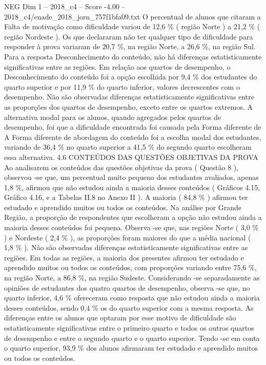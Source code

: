 \begin{textsample}{NEG Dim 1 – 2018\_c4 – Score -4.00 – 2018\_c4/enade\_2018\_jorn\_757f1bfa09.txt}
O percentual de alunos que citaram a Falta de motivação como dificuldade variou de 12,6 \% ( região Norte ) a 21,2 \% ( região Nordeste ).
Os que declararam não ter qualquer tipo de dificuldade para responder à prova variaram de 20,7 \%, na região Norte, a 26,6 \%, na região Sul.
Para a resposta Desconhecimento do conteúdo, não há diferenças estatisticamente significativas entre as regiões.
Em relação aos quartos de desempenho, o Desconhecimento do conteúdo foi a opção escolhida por 9,4 \% dos estudantes do quarto superior e por 11,9 \% do quarto inferior, valores decrescentes com o desempenho.
Não são observadas diferenças estatisticamente significativas entre as proporções dos quartos de desempenho, exceto entre os quartos extremos.
A alternativa modal para os alunos, quando agregados pelos quartos de desempenho, foi que a dificuldade encontrada foi causada pela Forma diferente de A Forma diferente de abordagem do conteúdo foi a escolha modal dos estudantes, variando de 36,4 \% no quarto superior a 41,5 \% do segundo quarto escolheram essa alternativa. 4.6 CONTEÚDOS DAS QUESTÕES OBJETIVAS DA PROVA Ao analisarem os conteúdos das questões objetivas da prova ( Questão 8 ), observou -se que, um percentual muito pequeno dos estudantes avaliados, apenas 1,8 \%, afirmou que não estudou ainda a maioria desses conteúdos ( Gráficos 4.15, Gráfico 4.16, e a Tabelas II.8 no Anexo II ).
A maioria ( 84,8 \% ) afirmou ter estudado e aprendido muitos ou todos os conteúdos.
Na análise por Grande Região, a proporção de respondentes que escolheram a opção não estudou ainda a maioria desses conteúdos foi pequena.
Observa -se que, nas regiões Norte ( 3,0 \% ) e Nordeste ( 2,4 \% ), as proporções foram maiores do que a média nacional ( 1,8 \% ).
Não são observadas diferenças estatisticamente significativas entre as regiões.
Em todas as regiões, a maioria dos presentes afirmou ter estudado e aprendido muitos ou todos os conteúdos, com proporções variando entre 75,6 \%, na região Norte, a 86,8 \%, na região Sudeste.
Considerando -se separadamente as opiniões de estudantes dos quatro quartos de desempenho, observa -se que, no quarto inferior, 4,6 \% ofereceram como resposta que não estudou ainda a maioria desses conteúdos, sendo 0,4 \% os do quarto superior com a mesma resposta.
As diferenças entre os alunos que optaram por esse motivo de dificuldade são estatisticamente significativas entre o primeiro quarto e todos os outros quartos de desempenho e entre o segundo quarto e o quarto superior.
Tendo -se em conta o quarto superior, 93,9 \% dos alunos afirmaram ter estudado e aprendido muitos ou todos os conteúdos.

\end{textsample}
